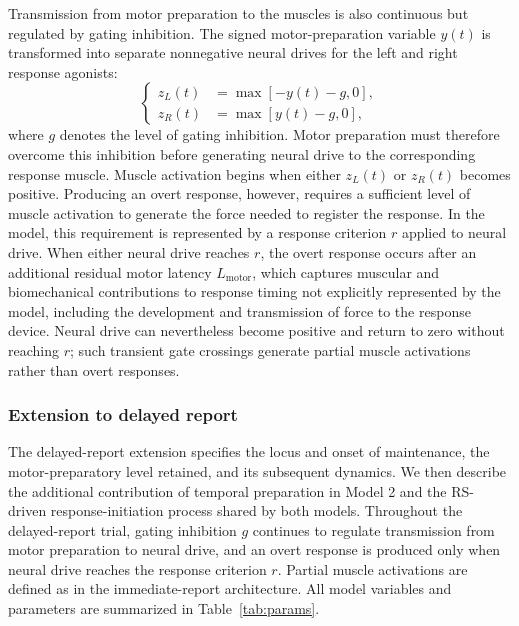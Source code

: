 \documentclass[a4paper,11pt]{article}
\theoremstyle{definition}
\newcommand{\1}{\mathbbm{1}}
\begin{document}
Transmission from motor preparation to the muscles is also continuous but regulated by gating inhibition. The signed motor-preparation variable $y(t)$ is transformed into separate nonnegative neural drives for the left and right response agonists:
\begin{equation}
\left\{\begin{aligned} z_{L}(t)&=\max\left[-y(t)-g,0\right],\\ z_{R}(t)&=\max\left[y(t)-g,0\right],\end{aligned}\right.
\label{eq:z}
\end{equation}
where $g$ denotes the level of gating inhibition. Motor preparation must therefore overcome this inhibition before generating neural drive to the corresponding response muscle. Muscle activation begins when either $z_{L}(t)$ or $z_{R}(t)$ becomes positive. Producing an overt response, however, requires a sufficient level of muscle activation to generate the force needed to register the response. In the model, this requirement is represented by a response criterion $r$ applied to neural drive. When either neural drive reaches $r$, the overt response occurs after an additional residual motor latency $L_{\mathrm{motor}}$, which captures muscular and biomechanical contributions to response timing not explicitly represented by the model, including the development and transmission of force to the response device. Neural drive can nevertheless become positive and return to zero without reaching $r$; such transient gate crossings generate partial muscle activations rather than overt responses.


\subsubsection{Extension to delayed report}

The delayed-report extension specifies the locus and onset of maintenance, the motor-preparatory level retained, and its subsequent dynamics. We then describe the additional contribution of temporal preparation in Model 2 and the RS-driven response-initiation process shared by both models. Throughout the delayed-report trial, gating inhibition $g$ continues to regulate transmission from motor preparation to neural drive, and an overt response is produced only when neural drive reaches the response criterion $r$. Partial muscle activations are defined as in the immediate-report architecture. All model variables and parameters are summarized in Table~\ref{tab:params}.
\end{document}
